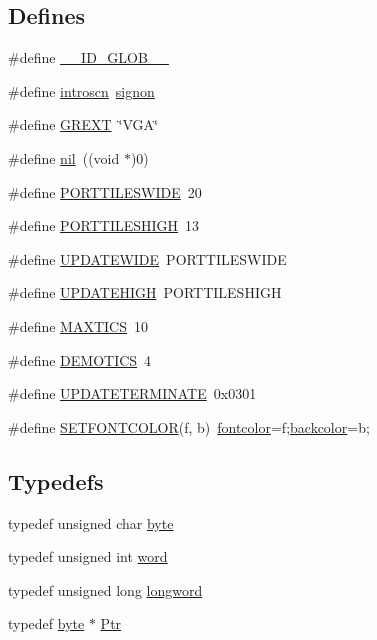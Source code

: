 \subsection*{Defines}
\begin{DoxyCompactItemize}
\item 
\#define \hyperlink{ID__HEADS_8H_ae474cb5b9cbc094abcdb9dd27ffb0adf}{\_\-\_\-ID\_\-GLOB\_\-\_\-}
\item 
\#define \hyperlink{ID__HEADS_8H_ae7f77f137be688c5ddcd90429356ded7}{introscn}~\hyperlink{ID__HEADS_8H_a22560db608c8ce9c9c0275585bf34980}{signon}
\item 
\#define \hyperlink{ID__HEADS_8H_a9a9541e78d738e65128cbd385fe29ffd}{GREXT}~\char`\"{}VGA\char`\"{}
\item 
\#define \hyperlink{ID__HEADS_8H_a7a7ca81d2a85873283b5ec82953b1b25}{nil}~((void $\ast$)0)
\item 
\#define \hyperlink{ID__HEADS_8H_afa3ac1c662c109ebb7be5de495de831b}{PORTTILESWIDE}~20
\item 
\#define \hyperlink{ID__HEADS_8H_ad1269eb32fea385c5db6c10d4190d6eb}{PORTTILESHIGH}~13
\item 
\#define \hyperlink{ID__HEADS_8H_a40cd9d9262b9ea0fbcd5b793e69331e6}{UPDATEWIDE}~PORTTILESWIDE
\item 
\#define \hyperlink{ID__HEADS_8H_ad2cc891daa548d3c1c773338e4337edc}{UPDATEHIGH}~PORTTILESHIGH
\item 
\#define \hyperlink{ID__HEADS_8H_a8e50b0fdb28a5a704176b37a86310281}{MAXTICS}~10
\item 
\#define \hyperlink{ID__HEADS_8H_a4eea8ea53242abc3c45f249e575e0625}{DEMOTICS}~4
\item 
\#define \hyperlink{ID__HEADS_8H_a797d7a97620edcdf1bdaf82dc77231b2}{UPDATETERMINATE}~0x0301
\item 
\#define \hyperlink{ID__HEADS_8H_a988e7152670dd3bd260a9e849c740cb6}{SETFONTCOLOR}(f, b)~\hyperlink{ID__VH_8H_a37dfad01117cac8636922fd4d030131b}{fontcolor}=f;\hyperlink{ID__VH_8C_ae05eaca54ea12a430673a8732425a748}{backcolor}=b;
\end{DoxyCompactItemize}
\subsection*{Typedefs}
\begin{DoxyCompactItemize}
\item 
typedef unsigned char \hyperlink{ID__HEADS_8H_a0c8186d9b9b7880309c27230bbb5e69d}{byte}
\item 
typedef unsigned int \hyperlink{ID__HEADS_8H_abad51e07ab6d26bec9f1f786c8d65bcd}{word}
\item 
typedef unsigned long \hyperlink{ID__HEADS_8H_a8a9a7dd50c6fdb45dcdf0eb929479663}{longword}
\item 
typedef \hyperlink{ID__HEAD_8H_a0c8186d9b9b7880309c27230bbb5e69d}{byte} $\ast$ \hyperlink{ID__HEADS_8H_a12c6a4af9f1e5c1a48e22de17a94ed1b}{Ptr}
\end{DoxyCompactItemize}
